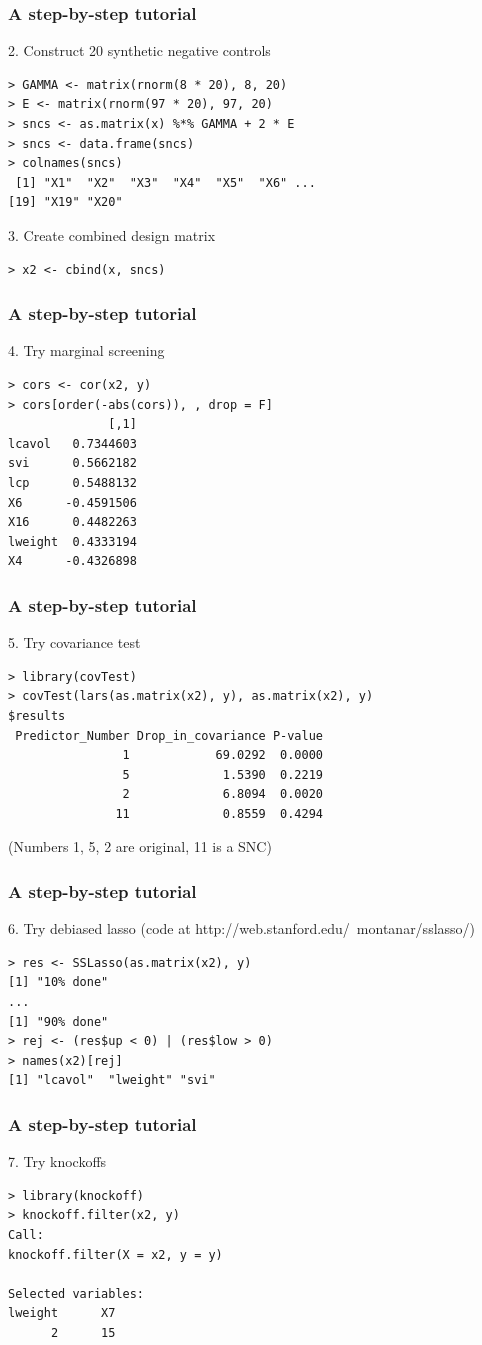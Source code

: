 \documentclass{beamer}
\begin{document}
\begin{frame}[fragile]
\frametitle{A step-by-step tutorial}
2. Construct 20 synthetic negative controls
\begin{verbatim}
> GAMMA <- matrix(rnorm(8 * 20), 8, 20)
> E <- matrix(rnorm(97 * 20), 97, 20)
> sncs <- as.matrix(x) %*% GAMMA + 2 * E
> sncs <- data.frame(sncs)
> colnames(sncs)
 [1] "X1"  "X2"  "X3"  "X4"  "X5"  "X6" ...
[19] "X19" "X20"
\end{verbatim}
3. Create combined design matrix
\begin{verbatim}
> x2 <- cbind(x, sncs)
\end{verbatim}
\end{frame}

\begin{frame}[fragile]
\frametitle{A step-by-step tutorial}
4. Try marginal screening
\begin{verbatim}
> cors <- cor(x2, y)
> cors[order(-abs(cors)), , drop = F]
              [,1]
lcavol   0.7344603
svi      0.5662182
lcp      0.5488132
X6      -0.4591506
X16      0.4482263
lweight  0.4333194
X4      -0.4326898
\end{verbatim}
\end{frame}

\begin{frame}[fragile]
\frametitle{A step-by-step tutorial}
5. Try covariance test
\begin{verbatim}
> library(covTest)
> covTest(lars(as.matrix(x2), y), as.matrix(x2), y)
$results
 Predictor_Number Drop_in_covariance P-value
                1            69.0292  0.0000
                5             1.5390  0.2219
                2             6.8094  0.0020
               11             0.8559  0.4294
\end{verbatim}
(Numbers 1, 5, 2 are original, 11 is a SNC)
\end{frame}

\begin{frame}[fragile]
\frametitle{A step-by-step tutorial}
6. Try debiased lasso (code at http://web.stanford.edu/~montanar/sslasso/)
\begin{verbatim}
> res <- SSLasso(as.matrix(x2), y)
[1] "10% done"
...
[1] "90% done"
> rej <- (res$up < 0) | (res$low > 0)
> names(x2)[rej]
[1] "lcavol"  "lweight" "svi"    
\end{verbatim}
\end{frame}

\begin{frame}[fragile]
\frametitle{A step-by-step tutorial}
7. Try knockoffs
\begin{verbatim}
> library(knockoff)
> knockoff.filter(x2, y)
Call:
knockoff.filter(X = x2, y = y)

Selected variables:
lweight      X7 
      2      15 
\end{verbatim}
\end{frame}
\end{document}

